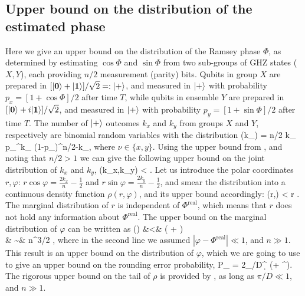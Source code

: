 \subsection{Upper bound on the distribution of the estimated phase}
\label{sec:Phase_estimation}

Here we give an upper bound on the distribution of the Ramsey phase $\Phi$, as
determined by estimating $\cos\Phi$ and $\sin\Phi$ from two sub-groups of
GHZ states ($X,Y$), each providing $n/2$ measurement (parity) bits.
Qubits in group $X$ are prepared in $[| \mathbf{0} \rangle +
| \mathbf{1} \rangle]/\sqrt{2} =:
| + \rangle$, and measured in $| + \rangle$ with probability $p_x = [1+\cos\Phi]/2$
 after time $T$, while qubits in ensemble $Y$ are prepared in $[| \mathbf{0} \rangle +
 i| \mathbf{1} \rangle]/\sqrt{2}$, and measured in $| + \rangle$  with probability $p_y
 = [1+\sin\Phi]/2$ after time $T$. The number of $| + \rangle$ outcomes $k_x$ and
 $k_y$ from groups $X$ and $Y$, respectively are binomial random variables
 with the distribution
 \bel
 	\PP(k_\nu) = {n/2 \choose k_\nu} p_\nu^{k_\nu} (1-p_\nu)^{n/2-k_\nu},
 \eel
where $\nu \in\{ x,y\}$. Using the upper bound from ,
and noting that $n/2 > 1$ we can give the following upper bound on the joint
distribution of $k_x$ and $k_y$,
\bel
	\PP(k_x,k_y) < \exp{}.
\eel
Let us introduce the polar coordinates $r,\varphi$: $r\cos\varphi =
\frac{2k_x}{n} - \frac{1}{2}$ and $r\sin\varphi = \frac{2k_y}{n} -
\frac{1}{2}$, and smear the distribution into a continuous  density
function $\rho(r,\varphi)$, and its upper bound accordingly:
\bel
	\rho(r,\varphi) <  r \exp{}.
\eel
The marginal distribution of $r$ is independent of $\Phi^\mathrm{real}$, which
means that $r$ does not hold any information about $\Phi^\mathrm{real}$. The upper
bound on the marginal distribution of $\varphi$ can be written as
\bal
	\rho(\varphi) &<&  \left( +
	\right)\exp{}
	\\
	\label{eq:Tail}
	& \sim &
	n^{3/2} \exp{},
\eal
where in the second line we assumed $|\varphi - \Phi^\mathrm{real}| \ll 1$, and
$n\gg 1$. This result is an upper bound on the distribution of $\varphi$, which
we are going to use to give an upper bound on the rounding error probability,
\bel 
	P_ = 2\intop_{\pi/D}^{\infty}\d{\varphi} \rho(\varphi +
	\Phi^).
\eel
The rigorous upper bound on the tail of $\rho$ is provided by ,
as long as $\pi/D \ll 1$, and $n \gg 1$.


